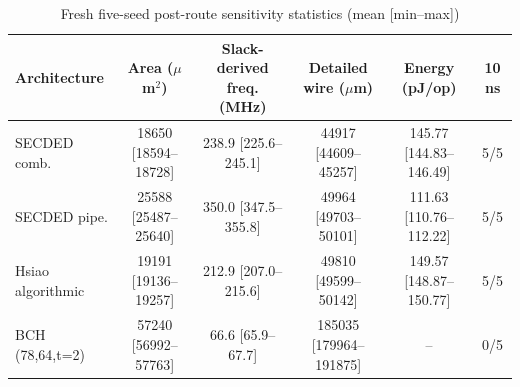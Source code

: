\begin{table}[t]
\caption{Fresh five-seed post-route sensitivity statistics (mean [min--max])}
\label{tab:results}
\centering
\scriptsize
\setlength{\tabcolsep}{3.4pt}
\begin{tabular}{@{}lccccc@{}}
\toprule
Architecture & Area ($\mu$m$^2$) & Slack-derived freq. (MHz) & Detailed wire ($\mu$m) & Energy (pJ/op) & 10 ns \\
\midrule
SECDED comb. & 18650 [18594--18728] & 238.9 [225.6--245.1] & 44917 [44609--45257] & 145.77 [144.83--146.49] & 5/5 \\
SECDED pipe. & 25588 [25487--25640] & 350.0 [347.5--355.8] & 49964 [49703--50101] & 111.63 [110.76--112.22] & 5/5 \\
Hsiao algorithmic & 19191 [19136--19257] & 212.9 [207.0--215.6] & 49810 [49599--50142] & 149.57 [148.87--150.77] & 5/5 \\
BCH (78,64,t=2) & 57240 [56992--57763] & 66.6 [65.9--67.7] & 185035 [179964--191875] & -- & 0/5 \\
\bottomrule
\end{tabular}
\end{table}
